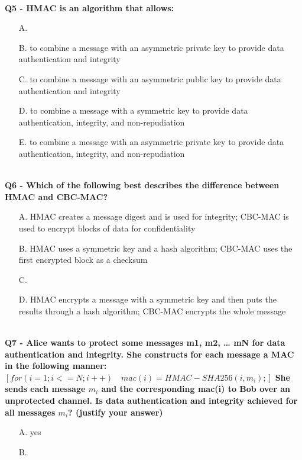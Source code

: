 \textbf{\\Q5 - HMAC is an algorithm that allows:}
\begin{enumerate}
    \item[A.] 
    \item[B.] to combine a message with an asymmetric private key to provide data authentication and integrity
    \item[C.] to combine a message with an asymmetric public key to provide data authentication and integrity
    \item[D.] to combine a message with a symmetric key to provide data authentication, integrity, and non-repudiation
    \item[E.] to combine a message with an asymmetric private key to provide data authentication, integrity, and non-repudiation
\end{enumerate}

\textbf{\\Q6 - Which of the following best describes the difference between HMAC and CBC-MAC?}
\begin{enumerate}
    \item[A.] HMAC creates a message digest and is used for integrity; CBC-MAC is used to encrypt blocks of data for confidentiality
    \item[B.] HMAC uses a symmetric key and a hash algorithm; CBC-MAC uses the first encrypted block as a checksum
    \item[C.] 
    \item[D.] HMAC encrypts a message with a symmetric key and then puts the results through a hash algorithm; CBC-MAC encrypts the whole message
\end{enumerate}

\textbf{\\Q7 - Alice wants to protect some messages m1, m2, … mN for data authentication and integrity. She constructs for each message a MAC in the following manner:}
\textbf{$[for (i=1; i<=N; i++) \quad mac(i) = HMAC-SHA256( i, m_{i} );]$}
\textbf{She sends each message $m_{i}$ and the corresponding mac(i)
to Bob over an unprotected channel.
Is data authentication and integrity achieved for all messages $m_{i}$? (justify your answer)}
\begin{enumerate}
    \item[A.] yes  
    \item[B.] 
\end{enumerate}

